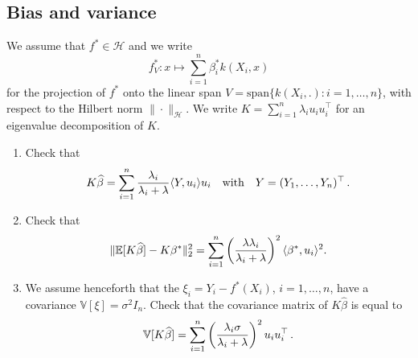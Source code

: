 \documentclass[a4paper,10pt,fleqn]{article}
\newcommand{\R}{\ensuremath{\mathbb{R}}}
\newcommand{\E}{\ensuremath{\mathbb{E}}}
\newcommand{\1}{\ensuremath{\mathbbm{1}}}
\begin{document}
\subsection{Bias and variance}
We assume that $f^*\in\mathcal{H}$ and we write 
$$f^*_{V}: x \mapsto \sum_{i=1}^n \beta_{i}^*k(X_{i},x)$$ 
for the projection of $f^*$ onto the linear span $V=\textrm{span}\{k(X_{i},.): i=1,\ldots,n\}$, with respect to the Hilbert norm $\|\cdot\|_{\mathcal{H}}$. We write $K=\sum_{i=1}^n \lambda_{i}u_{i}u_{i}^\top$ for an eigenvalue decomposition of $K$.
\begin{enumerate}
	\item Check that 
	$$K\widehat \beta= \sum_{i=1}^n {\lambda_{i}\over \lambda_{i}+\lambda} \langle Y, u_{i}\rangle u_{i}\quad\textrm{with}\quad Y=(Y_{1},\ldots,Y_{n})^\top\,.$$

%
	\item Check that
	$$\|\E[K\widehat \beta]-K\beta^*\|_2^2=\sum_{i=1}^n \left( \lambda\lambda_{i}\over \lambda_{i}+\lambda\right)^2 \langle \beta^*, u_{i}\rangle^2.$$
%
%
	\item We assume henceforth that the $\xi_{i}=Y_{i}-f^*(X_{i})$, $i=1,\ldots,n$, have a covariance $\mathbb{V}[\xi]=\sigma^2I_{n}$.
	Check that the covariance matrix of $K\widehat \beta$ is equal to
	$$\mathbb{V}[K\widehat \beta]=\sum_{i=1}^n \left(\lambda_{i}\sigma\over \lambda_{i}+\lambda\right)^2u_{i}u_{i}^\top\,.$$


\end{enumerate}
\end{document}
